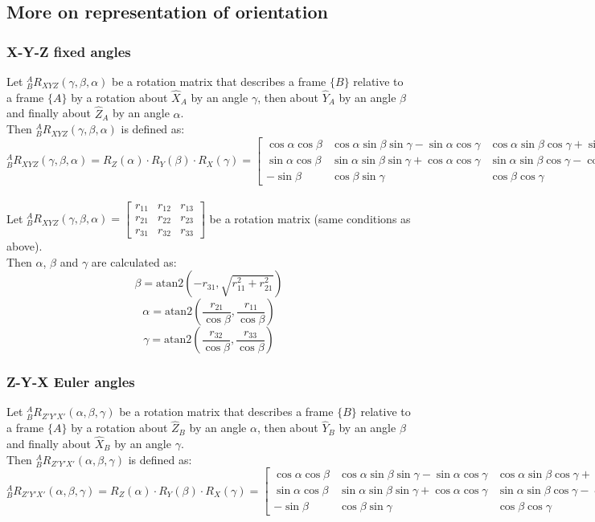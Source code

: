 \documentclass[10pt,a4paper]{article}
\newcommand{\vect}[1]{\ensuremath{\begin{bmatrix}#1\end{bmatrix}}}
\newcommand{\atan}{\ensuremath{\mathrm{atan2 }}}
\begin{document}
\subsection{More on representation of orientation}
\subsubsection{X-Y-Z fixed angles}
Let $^A_BR_{XYZ}(\gamma,\beta,\alpha)$ be a rotation matrix that describes a frame $\{B\}$ relative to a frame $\{A\}$ by a rotation about $\hat{X}_A$ by an angle $\gamma$, then about $\hat{Y}_A$ by an angle $\beta$ and finally about $\hat{Z}_A$ by an angle $\alpha$. \\
Then $^A_BR_{XYZ}(\gamma,\beta,\alpha)$ is defined as:
$$
	^A_BR_{XYZ}(\gamma,\beta,\alpha) = R_Z(\alpha) ⋅ R_Y(\beta) ⋅ R_X(\gamma) = \begin{bmatrix}
		\cos \alpha \cos \beta & \cos \alpha \sin \beta \sin \gamma - \sin \alpha \cos \gamma & \cos \alpha \sin \beta \cos \gamma + \sin \alpha \sin \gamma \\
		\sin \alpha \cos \beta & \sin \alpha \sin \beta \sin \gamma + \cos \alpha \cos \gamma & \sin \alpha \sin \beta \cos \gamma - \cos \alpha \sin \gamma \\
		- \sin \beta & \cos \beta \sin \gamma & \cos \beta \cos \gamma
	\end{bmatrix}
$$
\\

Let $^A_BR_{XYZ}(\gamma, \beta, \alpha) = \vect{r_{11} & r_{12} & r_{13} \\ r_{21} & r_{22} & r_{23} \\ r_{31} & r_{32} & r_{33}}$ be a rotation matrix (same conditions as above). \\
Then $\alpha$, $\beta$ and $\gamma$ are calculated as:
$$
	\beta = \atan (-r_{31}, \sqrt{r_{11}^2 + r_{21}^2})
$$
$$
	\alpha = \atan (\frac{r_{21}}{\cos \beta}, \frac{r_{11}}{\cos \beta})
$$
$$
	\gamma = \atan (\frac{r_{32}}{\cos \beta}, \frac{r_{33}}{\cos \beta})
$$

\subsubsection{Z-Y-X Euler angles}
Let $^A_BR_{Z'Y'X'}(\alpha, \beta, \gamma)$ be a rotation matrix that describes a frame $\{B\}$ relative to a frame $\{A\}$ by a rotation about $\hat{Z}_B$ by an angle $\alpha$, then about $\hat{Y}_B$ by an angle $\beta$ and finally about $\hat{X}_B$ by an angle $\gamma$. \\
Then $^A_BR_{Z'Y'X'}(\alpha, \beta, \gamma)$ is defined as:
$$
^A_BR_{Z'Y'X'}(\alpha, \beta, \gamma) = R_Z(\alpha) ⋅ R_Y(\beta) ⋅ R_X(\gamma) = \begin{bmatrix}
\cos \alpha \cos \beta & \cos \alpha \sin \beta \sin \gamma - \sin \alpha \cos \gamma & \cos \alpha \sin \beta \cos \gamma + \sin \alpha \sin \gamma \\
\sin \alpha \cos \beta & \sin \alpha \sin \beta \sin \gamma + \cos \alpha \cos \gamma & \sin \alpha \sin \beta \cos \gamma - \cos \alpha \sin \gamma \\
- \sin \beta & \cos \beta \sin \gamma & \cos \beta \cos \gamma
\end{bmatrix}
$$
\end{document}
